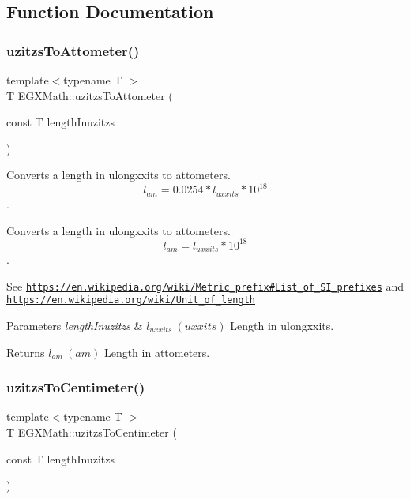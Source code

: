 \subsection{Function Documentation}
\mbox{\label{group___e_g_x_math-_conversions-_length_conversions-_imperial-uzitzs-_s_i_ga33c3f00e9fadcd52f2c0bfbd71a33d2b}} 
\subsubsection{\texorpdfstring{uzitzs\+To\+Attometer()}{uzitzsToAttometer()}}
{\footnotesize\ttfamily template$<$typename T $>$ \\
T E\+G\+X\+Math\+::uzitzs\+To\+Attometer (\begin{DoxyParamCaption}\item[{const T}]{length\+Inuzitzs }\end{DoxyParamCaption})}



Converts a length in ulongxxits to attometers. \[ l_{am}=0.0254 * l_{uxxits} * 10^{18} \]. 

Converts a length in ulongxxits to attometers. \[ l_{am}=l_{uxxits} * 10^{18} \].

See \href{https://en.wikipedia.org/wiki/Metric_prefix#List_of_SI_prefixes}{\tt https\+://en.\+wikipedia.\+org/wiki/\+Metric\+\_\+prefix\#\+List\+\_\+of\+\_\+\+S\+I\+\_\+prefixes} and \href{https://en.wikipedia.org/wiki/Unit_of_length}{\tt https\+://en.\+wikipedia.\+org/wiki/\+Unit\+\_\+of\+\_\+length} 
\begin{DoxyParams}{Parameters}
{\em length\+Inuzitzs} & $ l_{uxxits}\ (uxxits)$ Length in ulongxxits. \\
\hline
\end{DoxyParams}
\begin{DoxyReturn}{Returns}
$ l_{am}\ (am)$ Length in attometers. 
\end{DoxyReturn}
\mbox{\label{group___e_g_x_math-_conversions-_length_conversions-_imperial-uzitzs-_s_i_ga1fb15b72a000d43348190004a49ed7bc}} 
\subsubsection{\texorpdfstring{uzitzs\+To\+Centimeter()}{uzitzsToCentimeter()}}
{\footnotesize\ttfamily template$<$typename T $>$ \\
T E\+G\+X\+Math\+::uzitzs\+To\+Centimeter (\begin{DoxyParamCaption}\item[{const T}]{length\+Inuzitzs }\end{DoxyParamCaption})}



